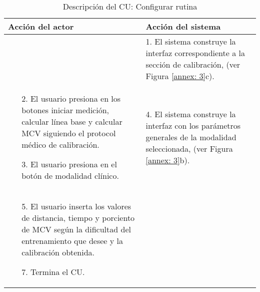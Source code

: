 \begin{table}
\begin{tabularx}{1.1\textwidth}{|X|X|}
        Acción del actor & Acción del sistema \\\hline
        & 
        1. El sistema construye la interfaz correspondiente a la sección de calibración, (ver Figura \ref{annex: 3}c). \\\hline
        \begin{enumerate}
            \item[2.] El usuario presiona en los botones iniciar medición, calcular línea base y calcular MCV siguiendo el protocol médico de calibración.
            \item[3.] El usuario presiona en el botón de modalidad clínico.
        \end{enumerate}
        &
        4. El sistema construye la interfaz con los parámetros generales de la modalidad seleccionada, (ver Figura \ref{annex: 3}b). \\\hline
        \begin{itemize}
            \item [5.] El usuario inserta los valores de distancia, tiempo y porciento de MCV según la dificultad del entrenamiento que desee y la calibración obtenida. 
            \item [7.] Termina el CU. 
        \end{itemize}
        &\\\hline
    \end{tabularx}
    \caption{Descripción del CU: Configurar rutina}
\end{table}